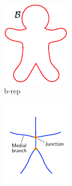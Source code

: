\begin{figure}
\begin{subfigure}[b]{0.25\linewidth}
		\includegraphics[width=\textwidth]{figs/gingerbreadman_brep.pdf}
		\caption{b-rep}
		\label{fig:gbm:brep}
	\end{subfigure}
	\qquad%
	\begin{subfigure}[b]{0.25\linewidth}
		\centering
		\includegraphics[width=\textwidth]{figs/gingerbreadman_skeleton.pdf}

\end{subfigure}
\end{figure}
